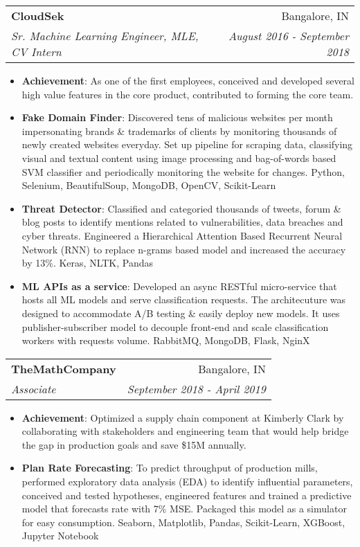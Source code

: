 \documentclass[letterpaper,11pt]{article}
\makeatletter
\newcommand{\resumeItem}[2]{
  \item\small{
    \textbf{#1}{: #2 \vspace{-2pt}}
  }
}
\newcommand{\resumeSubheading}[4]{
  \vspace{-1pt}\item
    \begin{tabular*}{0.97\textwidth}[t]{l@{\extracolsep{\fill}}r}
      \textbf{#1} & #2 \\
      \textit{\small#3} & \textit{\small #4} \\
    \end{tabular*}\vspace{-5pt}
}
\newcommand{\resumeItemListStart}{\begin{itemize}}
\newcommand{\resumeItemListEnd}{\end{itemize}\vspace{-5pt}}
\makeatother
\begin{document}
    \resumeSubheading
      {CloudSek}{Bangalore, IN}
      {Sr. Machine Learning Engineer, MLE, CV Intern}{August 2016 - September 2018}
      \resumeItemListStart
        \resumeItem{Achievement}
          {As one of the first employees, conceived and developed several high value features in the core product, contributed to forming the core team.}
        \resumeItem{Fake Domain Finder}
          {Discovered tens of malicious websites per month impersonating brands \& trademarks of clients by monitoring thousands of newly created websites everyday. Set up pipeline for scraping data, classifying visual and textual content using image processing and bag-of-words based SVM classifier and periodically monitoring the website for changes. \textcolor{RubineRed}{Python, Selenium, BeautifulSoup, MongoDB, OpenCV, Scikit-Learn}}
        \resumeItem{Threat Detector}
          {Classified and categoried thousands of tweets, forum \& blog posts to identify mentions related to vulnerabilities, data breaches and cyber threats. Engineered a Hierarchical Attention Based Recurrent Neural Network (RNN) to replace n-grams based model and increased the accuracy by 13\%. \textcolor{RubineRed}{Keras, NLTK, Pandas}}
        \resumeItem{ML APIs as a service}
          {Developed an async RESTful micro-service that hosts all ML models and serve classification requests. The architecuture was designed to accommodate A/B testing \& easily deploy new models. It uses publisher-subscriber model to decouple front-end and scale classification workers with requests volume. \textcolor{RubineRed}{RabbitMQ, MongoDB, Flask, NginX}}
      \resumeItemListEnd

    \resumeSubheading
      {TheMathCompany}{Bangalore, IN}
      {Associate}{September 2018 - April 2019}
      \resumeItemListStart
        \resumeItem{Achievement}
          {Optimized a supply chain component at Kimberly Clark by collaborating with stakeholders and engineering team that would help bridge the gap in production goals and save \$15M annually.}
        \resumeItem{Plan Rate Forecasting}
          {To predict throughput of production mills, performed exploratory data analysis (EDA) to identify influential parameters, conceived and tested hypotheses, engineered features and trained a predictive model that forecasts rate with 7\% MSE. Packaged this model as a simulator for easy consumption. \textcolor{RubineRed}{Seaborn, Matplotlib, Pandas, Scikit-Learn, XGBoost, Jupyter Notebook}}
      \resumeItemListEnd
\end{document}
